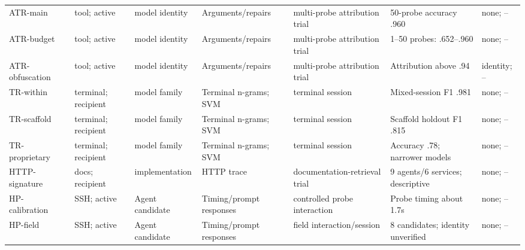 \begin{table}[t]
\begin{tabularx}{\textwidth}{@{}P{.14\textwidth}P{.11\textwidth}P{.13\textwidth}P{.14\textwidth}P{.12\textwidth}Y P{.09\textwidth}@{}}
ATR-main~\cite{zhao2026agenttrace} & tool; active & model identity & Arguments/repairs & multi-probe attribution trial & 50-probe accuracy .960 & none; -- \\
ATR-budget~\cite{zhao2026agenttrace} & tool; active & model identity & Arguments/repairs & multi-probe attribution trial & 1--50 probes: .652--.960 & none; -- \\
ATR-obfuscation~\cite{zhao2026agenttrace} & tool; active & model identity & Arguments/repairs & multi-probe attribution trial & Attribution above .94 & identity; -- \\
TR-within~\cite{ediga2026trace} & terminal; recipient & model family & Terminal n-grams; SVM & terminal session & Mixed-session F1 .981 & none; -- \\
TR-scaffold~\cite{ediga2026trace} & terminal; recipient & model family & Terminal n-grams; SVM & terminal session & Scaffold holdout F1 .815 & none; -- \\
TR-proprietary~\cite{ediga2026trace} & terminal; recipient & model family & Terminal n-grams; SVM & terminal session & Accuracy .78; narrower models & none; -- \\
HTTP-signature~\cite{borysenko2026http} & docs; recipient & implementation & HTTP trace & documentation-retrieval trial & 9 agents/6 services; descriptive & none; -- \\
HP-calibration~\cite{reworr2024honeypot} & SSH; active & Agent candidate & Timing/prompt responses & controlled probe interaction & Probe timing about 1.7s & none; -- \\
HP-field~\cite{reworr2024honeypot} & SSH; active & Agent candidate & Timing/prompt responses & field interaction/session & 8 candidates; identity unverified & none; -- \\
\bottomrule\end{tabularx}\end{table}
